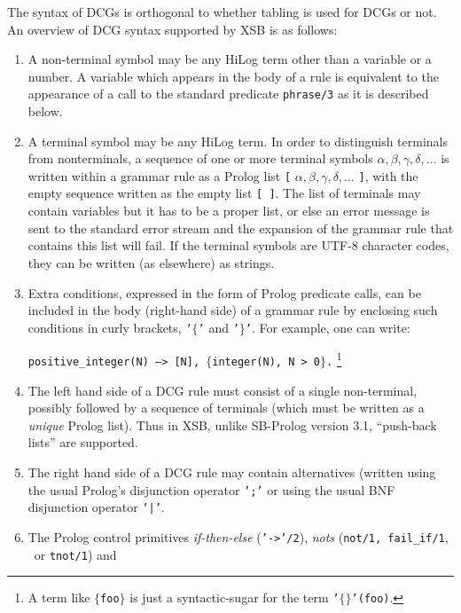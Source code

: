 The syntax of DCGs is orthogonal to whether tabling is used for DCGs
or not.  An overview of DCG syntax
 supported by XSB is as follows:
\begin{enumerate}
\item A non-terminal symbol may be any HiLog term other than a variable
      or a number. A variable which appears in the body of a rule is
      equivalent to the appearance of a call to the standard predicate
      {\tt phrase/3} as it is described below.
\item A terminal symbol may be any HiLog term. In order to distinguish 
      terminals from nonterminals, a sequence of one or more terminal
      symbols   $\alpha, \beta, \gamma, \delta, \ldots$
      is written within a grammar rule as a Prolog list 
         {\tt [} $\alpha, \beta, \gamma, \delta, \ldots$ {\tt ]},
      with the empty sequence written as the empty list {\tt [\,]}.
      The list of terminals may contain variables but it has to be a 
      proper list, or else an error message is sent to the standard 
      error stream and the expansion of the grammar rule that contains 
      this list will fail. If the terminal symbols are UTF-8 character
      codes, they can be written (as elsewhere) as strings.
\item Extra conditions, expressed in the form of Prolog predicate calls, 
      can be included in the body (right-hand side) of a grammar rule by 
      enclosing such conditions in curly brackets, {\tt '$\{$'} and
      {\tt '$\}$'}.
      For example, one can write:
      \begin{center}
                {\tt positive\_integer(N) --> [N], $\{$integer(N), N > 0$\}$.}
                \footnote{A term like {\tt $\{$foo$\}$} is just a
			  syntactic-sugar for the term {\tt '$\{\}$'(foo)}.}
      \end{center}
\item The left hand side of a DCG rule must consist of a single non-terminal,
      possibly followed by a sequence of terminals (which must be written as
      a {\em unique} Prolog list). Thus in XSB, unlike SB-Prolog 
      version 3.1, ``push-back lists'' are supported.
\item The right hand side of a DCG rule may contain alternatives (written 
      using the usual Prolog's disjunction operator {\tt ';'} or 
      using the usual BNF disjunction operator {\tt '|'}. 
\item The Prolog control primitives {\em if-then-else} ({\tt '->'/2}),
      {\em nots} ({\tt not/1, fail\_if/1}, \not\ or {\tt tnot/1}) and 

\end{enumerate}
